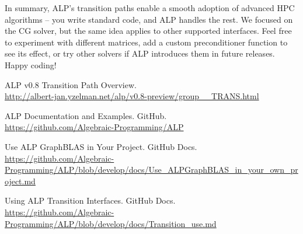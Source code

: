 In summary, ALP’s transition paths enable a smooth adoption of advanced HPC algorithms – you write
standard code, and ALP handles the rest. We focused on the CG solver, but the same idea applies to other
supported interfaces. Feel free to experiment with different matrices, add a custom preconditioner function
to see its effect, or try other solvers if ALP introduces them in future releases. Happy coding!

    



\begin{thebibliography}{9}

ALP v0.8 Transition Path Overview. \\
\url{http://albert-jan.yzelman.net/alp/v0.8-preview/group__TRANS.html}

ALP Documentation and Examples. GitHub. \\
\url{https://github.com/Algebraic-Programming/ALP}

Use ALP GraphBLAS in Your Project. GitHub Docs. \\
\url{https://github.com/Algebraic-Programming/ALP/blob/develop/docs/Use_ALPGraphBLAS_in_your_own_project.md}

Using ALP Transition Interfaces. GitHub Docs. \\
\url{https://github.com/Algebraic-Programming/ALP/blob/develop/docs/Transition_use.md}

\end{thebibliography}
